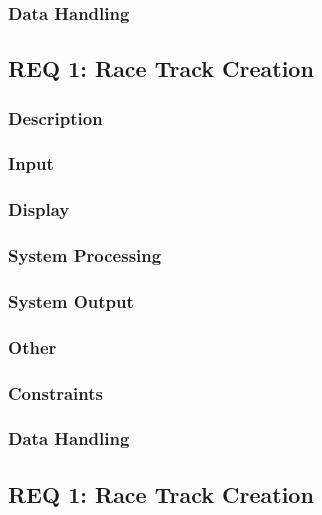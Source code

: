 \documentclass[a4paper, 11pt]{article} %
\begin{document}
\subsubsection{Data Handling}

\newpage

\subsection{REQ 1: Race Track Creation}

\subsubsection{Description}

\subsubsection{Input}

\subsubsection{Display}

\subsubsection{System Processing}

\subsubsection{System Output}

\subsubsection{Other}

\subsubsection{Constraints}

\subsubsection{Data Handling}

\newpage

\subsection{REQ 1: Race Track Creation}
\end{document}
